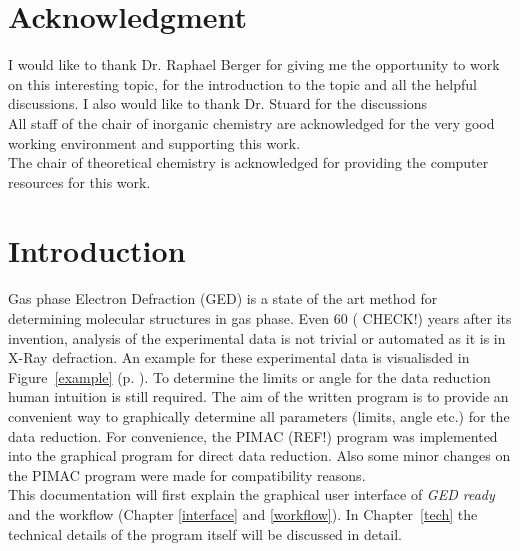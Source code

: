 \section*{Acknowledgment}
I would like to thank Dr. Raphael Berger for giving me the opportunity to work on this interesting topic, for the introduction to the topic and all the helpful discussions. I also would like to thank Dr. Stuard for the discussions \\
All staff of the chair of inorganic chemistry are acknowledged for the very good working  environment and supporting this work. \\
The chair of theoretical chemistry is acknowledged for providing the computer resources for this work. 




\section{Introduction}
Gas phase Electron Defraction  (GED) is a state of the art method for determining molecular structures in gas phase. Even 60 ( CHECK!) years after its invention, analysis of the experimental data is not trivial or automated as it is in X-Ray defraction. An example for these experimental data is visualisded in Figure~\ref{example} (p. \pageref{exaple}). To determine the limits or angle for the data reduction human intuition is still required. The aim of the written program is to provide an convenient way to graphically determine all parameters (limits, angle etc.) for the data reduction. For convenience, the PIMAC (REF!) program was implemented into the graphical program for direct data reduction. Also some minor changes on the PIMAC program were made for compatibility reasons. \\
This documentation will first explain the graphical user interface of \textit{GED ready} and the workflow (Chapter \ref{interface} and \ref{workflow}). In Chapter~\ref{tech} the technical details of the program itself will be discussed in detail. 
 


 